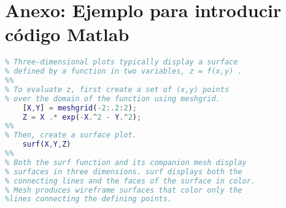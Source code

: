 \chapter*{Anexo: Ejemplo para introducir código Matlab}

\renewcommand{\baselinestretch}{1}
\begin{lstlisting}[language=Matlab]
%% 3-D Plots
% Three-dimensional plots typically display a surface 
% defined by a function in two variables, z = f(x,y) .
%%
% To evaluate z, first create a set of (x,y) points 
% over the domain of the function using meshgrid.
	[X,Y] = meshgrid(-2:.2:2);                                
	Z = X .* exp(-X.^2 - Y.^2);
%%
% Then, create a surface plot.
	surf(X,Y,Z)
%%
% Both the surf function and its companion mesh display 
% surfaces in three dimensions. surf displays both the 
% connecting lines and the faces of the surface in color. 
% Mesh produces wireframe surfaces that color only the 
%lines connecting the defining points.

\end{lstlisting}
\renewcommand{\baselinestretch}{1.5}




